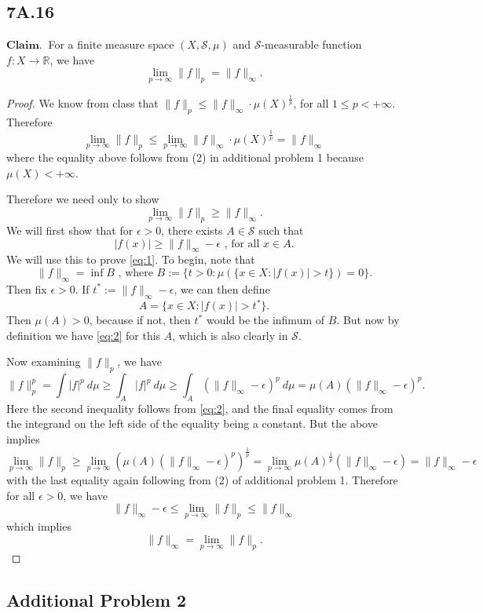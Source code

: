 \documentclass[12pt]{article}
\newcommand{\R}{\mathbb{R}}
\newcommand{\eq}[1]{\begin{equation*}#1\end{equation*}}
\newcommand{\qeq}[1]{\begin{equation}#1\end{equation}}
\begin{document}
\subsection*{7A.16}

$\mathbf{Claim.}~$ For a finite measure space $(X, \mathcal{S}, \mu)$ and $\mathcal{S}$-measurable function $f : X \to \R$, we have 
\eq{\lim_{p \to \infty} \|f\|_p = \|f\|_\infty.}

\begin{proof}
    We know from class that $\|f\|_p \leq \|f\|_\infty \cdot \mu(X)^\frac{1}{p}$, for all $1 \leq p < +\infty$. Therefore
    \eq{\lim_{p \to \infty} \|f\|_p \leq \lim_{p \to \infty}\|f\|_\infty \cdot \mu(X)^\frac{1}{p} = \|f\|_\infty}
    where the equality above follows from (2) in additional problem 1 because $\mu(X) < + \infty$.

    Therefore we need only to show
    \qeq{\lim_{p \to \infty} \|f\|_p \geq \|f\|_\infty. \label{eq:1}} 
    We will first show that for $\epsilon > 0$, there exists $A \in \mathcal{S}$ such that
    \qeq{|f(x)| \geq \|f\|_\infty - \epsilon \text{ , for all } x \in A. \label{eq:2}}
    We will use this to prove \eqref{eq:1}. To begin, note that
    \eq{\|f\|_\infty = \inf B \text{ , where } B :=\{ t > 0 : \mu(\{ x \in X : |f(x)| > t\}) = 0\}.}
    Then fix $\epsilon > 0$. If $t^* := \|f\|_\infty - \epsilon$, we can then define
    \eq{A = \{x \in X : |f(x)| > t^*\}.} Then $\mu(A) > 0$, because if not, then $t^*$ would be the infimum of $B$. But now by definition we have \eqref{eq:2} for this $A$, which is also clearly in $\mathcal{S}$.

    Now examining $\|f\|_p$, we have
    \eq{\|f\|_p^p = \int |f|^p ~d\mu \geq \int_A |f|^p ~d \mu \geq \int_A (\|f\|_\infty - \epsilon)^p ~d \mu = \mu(A)(\|f\|_\infty - \epsilon)^p.}
    Here the second inequality follows from \eqref{eq:2}, and the final equality comes from the integrand on the left side of the equality being a constant. But the above implies
    \eq{\lim_{p \to \infty} \|f\|_p \geq \lim_{p \to \infty} (\mu(A)(\|f\|_\infty - \epsilon)^p)^\frac{1}{p} = \lim_{p \to \infty} \mu(A)^\frac{1}{p} (\|f\|_\infty - \epsilon) = \|f\|_\infty - \epsilon}
    with the last equality again following from (2) of additional problem 1.
    Therefore for all $\epsilon > 0$, we have
    \eq{\|f\|_\infty - \epsilon \leq \lim_{p \to \infty} \|f\|_p \leq \|f\|_\infty}
    which implies
    \eq{\|f\|_\infty = \lim_{p \to \infty} \|f\|_p.}
\end{proof}

\subsection*{Additional Problem 2}
\end{document}
